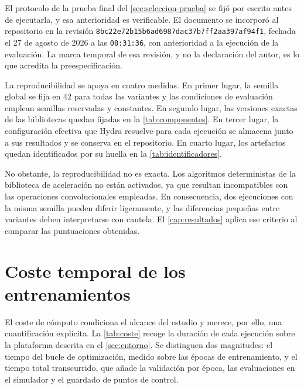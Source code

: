 
El protocolo de la prueba final del \cref{sec:seleccion-prueba} se fij\'o por escrito antes
de ejecutarla, y esa anterioridad es verificable. El documento se incorpor\'o al
repositorio en la revisi\'on \texttt{8bc22e72b15b6ad6987dac37b7ff2aa397af94f1}, fechada el
\num{27} de agosto de \num{2026} a las \texttt{08:31:36}, con anterioridad a la ejecuci\'on
de la evaluaci\'on. La marca temporal de esa revisi\'on, y no la declaraci\'on del autor,
es lo que acredita la preespecificaci\'on.


La reproducibilidad se apoya en cuatro medidas. En primer lugar, la semilla global se fija
en \num{42} para todas las variantes y las condiciones de evaluaci\'on emplean semillas
reservadas y constantes. En segundo lugar, las versiones exactas de las bibliotecas quedan
fijadas en la \cref{tab:componentes}. En tercer lugar, la configuraci\'on efectiva que
Hydra resuelve para cada ejecuci\'on se almacena junto a sus resultados y se conserva en el
repositorio. En cuarto lugar, los artefactos quedan identificados por su huella en la
\cref{tab:identificadores}.

No obstante, la reproducibilidad no es exacta. Los algoritmos deterministas de la
biblioteca de aceleraci\'on no est\'an activados, ya que resultan incompatibles con las
operaciones convolucionales empleadas. En consecuencia, dos ejecuciones con la misma
semilla pueden diferir ligeramente, y las diferencias peque\~nas entre variantes deben
interpretarse con cautela. El \cref{cap:resultados} aplica ese criterio al comparar las
puntuaciones obtenidas.

\section{Coste temporal de los entrenamientos}
\label{sec:coste}

El coste de c\'omputo condiciona el alcance del estudio y merece, por ello, una
cuantificaci\'on expl\'icita. La \cref{tab:coste} recoge la duraci\'on de cada ejecuci\'on
sobre la plataforma descrita en el \cref{sec:entorno}. Se distinguen dos magnitudes: el
tiempo del bucle de optimizaci\'on, medido sobre las \'epocas de entrenamiento, y el tiempo
total transcurrido, que a\~nade la validaci\'on por \'epoca, las evaluaciones en el
simulador y el guardado de puntos de control.

